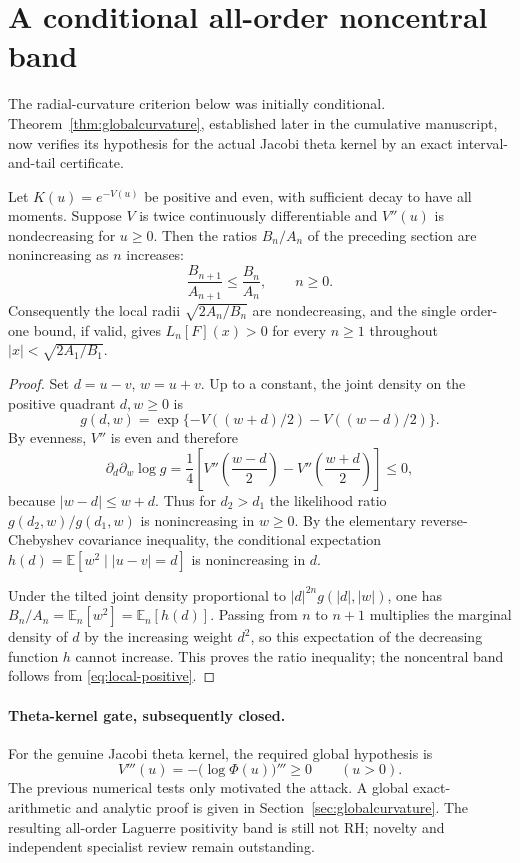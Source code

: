 \section{A conditional all-order noncentral band}
The radial-curvature criterion below was initially conditional.
Theorem~\ref{thm:globalcurvature}, established later in the
cumulative manuscript, now verifies its hypothesis for the actual
Jacobi theta kernel by an exact interval-and-tail certificate.

\begin{proposition}\label{prop:radial}
Let $K(u)=e^{-V(u)}$ be positive and even, with sufficient
decay to have all moments. Suppose $V$ is twice continuously
differentiable and $V''(u)$ is nondecreasing for $u\ge0$.
Then the ratios $B_n/A_n$ of the preceding section
are nonincreasing as $n$ increases:
\[
\frac{B_{n+1}}{A_{n+1}}\le
\frac{B_n}{A_n},\qquad n\ge0.
\]
Consequently the local radii $\sqrt{2A_n/B_n}$
are nondecreasing, and the single order-one bound,
if valid, gives $L_n[F](x)>0$ for every $n\ge1$
throughout $|x|<\sqrt{2A_1/B_1}$.
\end{proposition}
\begin{proof}
Set $d=u-v$, $w=u+v$. Up to a constant, the
joint density on the positive quadrant $d,w\ge0$ is
\[
g(d,w)=\exp\{-V((w+d)/2)-V((w-d)/2)\}.
\]
By evenness, $V''$ is even and therefore
\[
\partial_d\partial_w\log g
=\frac14\left[V''\!\left(\frac{w-d}{2}\right)
                  -V''\!\left(\frac{w+d}{2}\right)\right]
\le0,
\]
because $|w-d|\le w+d$. Thus for $d_2>d_1$
the likelihood ratio $g(d_2,w)/g(d_1,w)$
is nonincreasing in $w\ge0$. By the elementary
reverse-Chebyshev covariance inequality, the
conditional expectation $h(d)=
\mathbb E[w^2\mid |u-v|=d]$ is nonincreasing in $d$.

Under the tilted joint density proportional to
$|d|^{2n}g(|d|,|w|)$, one has
$B_n/A_n=\mathbb E_n[w^2]=\mathbb E_n[h(d)]$.
Passing from $n$ to $n+1$ multiplies the marginal
density of $d$ by the increasing weight $d^2$,
so this expectation of the decreasing function
$h$ cannot increase. This proves the ratio
inequality; the noncentral band follows from
\eqref{eq:local-positive}.
\end{proof}

\paragraph{Theta-kernel gate, subsequently closed.}
For the genuine Jacobi theta kernel, the required
global hypothesis is
\[
V'''(u)=-\big(\log\Phi(u)\big)'''\ge0
\qquad(u>0).
\]
The previous numerical tests only motivated the attack.
A global exact-arithmetic and analytic proof is given in
Section~\ref{sec:globalcurvature}. The resulting all-order
Laguerre positivity band is still not RH; novelty
and independent specialist review remain outstanding.
